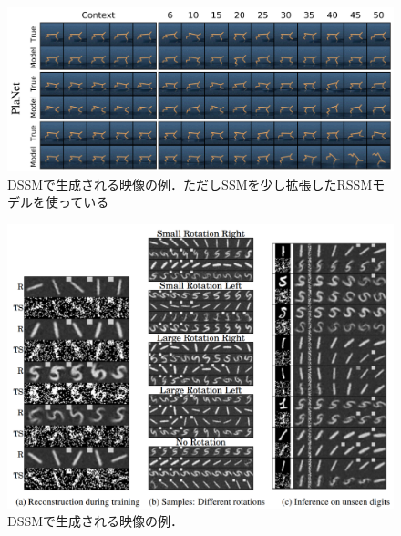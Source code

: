 \begin{figure}[tbp]
  \begin{center}
    \includegraphics[width=\linewidth]{./figures/dssm_planet.png}
    \caption{DSSMで生成される映像の例．ただしSSMを少し拡張したRSSMモデルを使っている}
    \label{fig:dssm_planet}
  \end{center}
\end{figure}

\begin{figure}[tbp]
  \begin{center}
    \includegraphics[width=\linewidth]{./figures/dssm_dkf.png}
    \caption{DSSMで生成される映像の例．}
    \label{fig:dssm_dkf}
  \end{center}
\end{figure}
